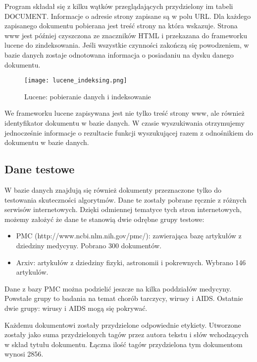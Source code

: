Program składał się z kilku wątków przeglądających przydzielony im tabeli DOCUMENT. Informacje o adresie strony zapisane są w polu URL. Dla każdego zapisanego dokumentu pobierana jest treść strony na która wskazuje. Strona www jest później czyszczona ze znaczników HTML i przekazana do frameworku lucene do zindeksowania. Jeśli wszystkie czynności zakończą się powodzeniem, w bazie danych zostaje odnotowana informacja o posiadaniu na dysku danego dokumentu. 


\begin{figure}[htb]

\texttt{[image: lucene\_indeksing.png]}
\caption{Lucene: pobieranie danych i indeksowanie}
\label{fig:lucene_index_fig}
\end{figure}

We frameworku lucene zapisywana jest nie tylko treść strony www, ale również identyfikator dokumentu w bazie danych. W czasie wyszukiwania otrzymujemy jednocześnie informacje o rezultacie funkcji wyszukującej razem z odnośnikiem do dokumentu w bazie danych.



\subsection{Dane testowe}

W bazie danych znajdują się również dokumenty przeznaczone tylko do testowania skuteczności algorytmów. Dane te zostały pobrane ręcznie z różnych serwisów internetowych. Dzięki odmiennej tematyce tych stron internetowych, możemy założyć że dane te stanowią dwie odrębne grupy testowe:

\begin{itemize}
    \item PMC (http://www.ncbi.nlm.nih.gov/pmc/): zawierająca bazę artykułów z dziedziny medycyny. Pobrano 300 dokumentów.
    \item Arxiv: artykułów z dziedziny fizyki, astronomii i pokrewnych. Wybrano 146 artykulów.
\end{itemize}

Dane z bazy PMC można podzielić jeszcze na kilka poddziałów medycyny. Powstałe grupy to badania na temat chorób tarczycy, wirusy i AIDS. Ostatnie dwie grupy: wirusy i AIDS mogą się pokrywać. 

Każdemu dokumentowi zostały przydzielone odpowiednie etykiety. Utworzone zostały jako suma przydzielonych tagów przez autora tekstu i słów wchodzących w skład tytułu dokumentu.  Łączna ilość tagów przydzielona tym dokumentom wynosi 2856. 

